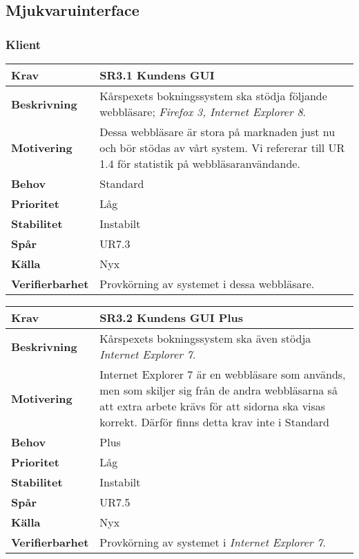 \documentclass[a4paper, twoside, 11pt, titlepage]{article}
\begin{document}
	\subsection{Mjukvaruinterface}



		\subsubsection{Klient}


		\begin{tabular} { p{2.6cm} p{12.5cm} }
			\hline
			\sffamily\textbf{Krav} & \sffamily\textbf{SR3.1 Kundens GUI } \\
			\hline
			\sffamily\textbf{Beskrivning} & Kårspexets bokningssystem ska stödja följande webbläsare; \emph{Firefox 3\underline{}, \emph{Internet Explorer 8}}.   \\
			\hline
			\sffamily\textbf{Motivering} & Dessa webbläsare är stora på marknaden just nu och bör stödas av vårt system. Vi refererar till UR 1.4 för statistik på webbläsaranvändande.  \\
			\hline
			\sffamily\textbf{Behov} & Standard  \\
			\hline
			\sffamily\textbf{Prioritet} & Låg  \\
			\hline
			\sffamily\textbf{Stabilitet} & Instabilt  \\
			\hline
			\sffamily\textbf{Spår} & UR7.3  \\
			\hline
			\sffamily\textbf{Källa} & Nyx  \\
			\hline
			\sffamily\textbf{Verifierbarhet} & Provkörning av systemet i dessa webbläsare.  \\
			\hline
		\end{tabular}
		\vspace{6mm}

		\begin{tabular} { p{2.6cm} p{12.5cm} }
			\hline
			\sffamily\textbf{Krav} & \sffamily\textbf{SR3.2 Kundens GUI Plus } \\
			\hline
			\sffamily\textbf{Beskrivning} & Kårspexets bokningssystem ska även stödja \emph{Internet Explorer 7}.  \\
			\hline
			\sffamily\textbf{Motivering} & Internet Explorer 7 är en webbläsare som används, men som skiljer sig från de andra webbläsarna så att extra arbete krävs för att sidorna ska visas korrekt. Därför finns detta krav inte i Standard  \\
			\hline
			\sffamily\textbf{Behov} & Plus  \\
			\hline
			\sffamily\textbf{Prioritet} & Låg  \\
			\hline
			\sffamily\textbf{Stabilitet} & Instabilt  \\
			\hline
			\sffamily\textbf{Spår} & UR7.5  \\
			\hline
			\sffamily\textbf{Källa} & Nyx  \\
			\hline
			\sffamily\textbf{Verifierbarhet} & Provkörning av systemet i \emph{Internet Explorer 7}.  \\
			\hline
		\end{tabular}
\end{document}
